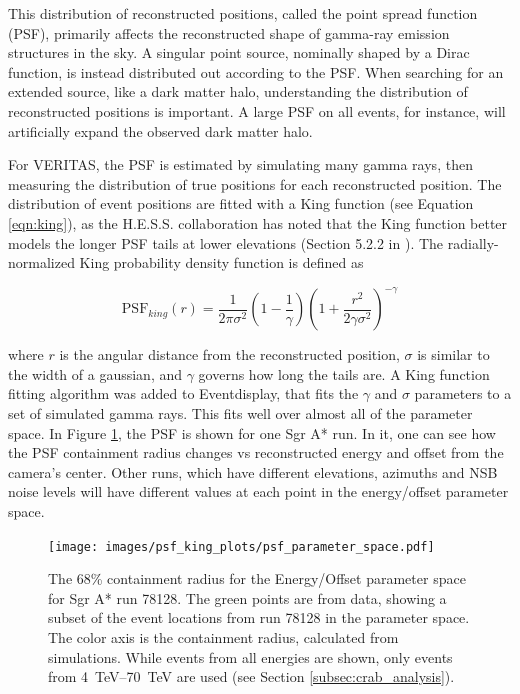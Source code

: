     This distribution of reconstructed positions, called the point spread function (PSF), primarily affects the reconstructed shape of gamma-ray emission structures in the sky.
    A singular point source, nominally shaped by a Dirac function, is instead distributed out according to the PSF.
    When searching for an extended source, like a dark matter halo, understanding the distribution of reconstructed positions is important.
    A large PSF on all events, for instance, will artificially expand the observed dark matter halo.

    For VERITAS, the PSF is estimated by simulating many gamma rays, then measuring the distribution of true positions for each reconstructed position.
    The distribution of event positions are fitted with a King function \cite{king1962} (see Equation \ref{eqn:king}), as the H.E.S.S. collaboration has noted that the King function better models the longer PSF tails at lower elevations (Section 5.2.2 in \cite{Mayer2015}).
    The radially-normalized King probability density function is defined as

    \begin{equation} \label{eqn:king}
    \text{PSF}_{king}(r) = \frac{1}{2 \pi \sigma^{2} } \left( 1 - \frac{1}{\gamma} \right) \left( 1 + \frac{ r^{2} }{ 2 \gamma \sigma^{2} } \right)^{-\gamma}
    \end{equation}

    where $r$ is the angular distance from the reconstructed position, $\sigma$ is similar to the width of a gaussian, and $\gamma$ governs how long the tails are.
    A King function fitting algorithm was added to Eventdisplay, that fits the $\gamma$ and $\sigma$ parameters to a set of simulated gamma rays.
    This fits well over almost all of the parameter space.
    In Figure \ref{fig:psf_paramspace}, the PSF is shown for one Sgr A* run.
    In it, one can see how the PSF containment radius changes vs reconstructed energy and offset from the camera's center.
    Other runs, which have different elevations, azimuths and NSB noise levels will have different values at each point in the energy/offset parameter space.

    \begin{figure}[ht]
      \centering
      \texttt{[image: images/psf\_king\_plots/psf\_parameter\_space.pdf]}
      \caption[PSF Parameter Space]{
        The 68\% containment radius for the Energy/Offset parameter space for Sgr A* run 78128. 
        The green points are from data, showing a subset of the event locations from run 78128 in the parameter space.
        The color axis is the containment radius, calculated from simulations.
        While events from all energies are shown, only events from \SIrange{4}{70}{\TeV} are used (see Section \ref{subsec:crab_analysis}).
      }
      \label{fig:psf_paramspace}
    \end{figure}

